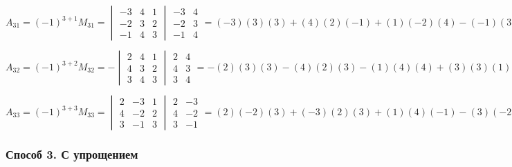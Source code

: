 \documentclass{article}
\begin{document}
$
A_{31} = (-1)^{3+1} M_{31} =
\begin{vmatrix}
	-3 & 4 & 1 \\
	-2 & 3 & 2 \\
	-1 & 4 & 3
\end{vmatrix}
\begin{matrix}
	-3 & 4 \\
	-2 & 3 \\
	-1 & 4
\end{matrix}
= (-3)(3)(3) + (4)(2)(-1) + (1)(-2)(4)
- (-1)(3)(1) - (4)(2)(-3) - (3)(-2)(4) =
-27 - 8 - 8 + 3 + 24 + 24 = 8
$

$
A_{32} = (-1)^{3+2} M_{32} =
-\begin{vmatrix}
	2 & 4 & 1 \\
	4 & 3 & 2 \\
	3 & 4 & 3
\end{vmatrix}
\begin{matrix}
	2 & 4 \\
	4 & 3 \\
	3 & 4
\end{matrix}
= -(2)(3)(3) - (4)(2)(3) - (1)(4)(4)
+ (3)(3)(1) + (4)(2)(2) + (3)(4)(4) =
-(18 + 24 + 16 - 9 - 16 - 48) = 15
$

$
A_{33} = (-1)^{3+3} M_{33} =
\begin{vmatrix}
	2 & -3 & 1 \\
	4 & -2 & 2 \\
	3 & -1 & 3
\end{vmatrix}
\begin{matrix}
	2 & -3 \\
	4 & -2 \\
	3 & -1
\end{matrix}
= (2)(-2)(3) + (-3)(2)(3) + (1)(4)(-1)
- (3)(-2)(1) - (-1)(2)(2) - (3)(4)(-3) = ...
$

\subsubsection{Способ 3. С упрощением}
\end{document}
